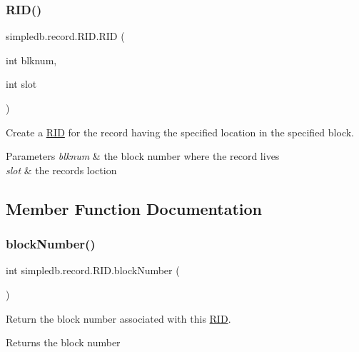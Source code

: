 \subsubsection{\texorpdfstring{R\+I\+D()}{RID()}}
{\footnotesize\ttfamily simpledb.\+record.\+R\+I\+D.\+R\+ID (\begin{DoxyParamCaption}\item[{int}]{blknum,  }\item[{int}]{slot }\end{DoxyParamCaption})\hspace{0.3cm}{\ttfamily [inline]}}

Create a \hyperlink{classsimpledb_1_1record_1_1RID}{R\+ID} for the record having the specified location in the specified block. 
\begin{DoxyParams}{Parameters}
{\em blknum} & the block number where the record lives \\
\hline
{\em slot} & the record\textquotesingle{}s loction \\
\hline
\end{DoxyParams}


\subsection{Member Function Documentation}
\mbox{\label{classsimpledb_1_1record_1_1RID_adb8274ea23b81d3c0a06e5d2bb8da896}} 
\subsubsection{\texorpdfstring{block\+Number()}{blockNumber()}}
{\footnotesize\ttfamily int simpledb.\+record.\+R\+I\+D.\+block\+Number (\begin{DoxyParamCaption}{ }\end{DoxyParamCaption})\hspace{0.3cm}{\ttfamily [inline]}}

Return the block number associated with this \hyperlink{classsimpledb_1_1record_1_1RID}{R\+ID}. \begin{DoxyReturn}{Returns}
the block number 
\end{DoxyReturn}
\mbox{\label{classsimpledb_1_1record_1_1RID_ac8ee042c2b776110c3a47b8979357f45}} 
